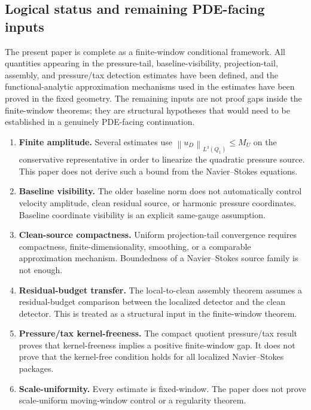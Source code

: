 \documentclass[11pt]{article}
\numberwithin{equation}{section}
\theoremstyle{definition}
\theoremstyle{remark}
\newcommand{\norm}[2]{\left\|#1\right\|_{#2}}
\begin{document}
\subsection{Logical status and remaining PDE-facing inputs}
\label{sec:status-limitations}

The present paper is complete as a finite-window conditional framework.  All
quantities appearing in the pressure-tail, baseline-visibility, projection-tail,
assembly, and pressure/tax detection estimates have been defined, and the
functional-analytic approximation mechanisms used in the estimates have been
proved in the fixed geometry.  The remaining inputs are not proof gaps inside
the finite-window theorems; they are structural hypotheses that would need to be
established in a genuinely PDE-facing continuation.

\begin{enumerate}[label=(\roman*),leftmargin=*]
    \item \textbf{Finite amplitude.}  Several estimates use
    \(\norm{u_D}{L^3(Q_1)}\le M_U\) on the conservative representative in order
    to linearize the quadratic pressure source.  This paper does not derive
    such a bound from the Navier--Stokes equations.
    \item \textbf{Baseline visibility.}  The older baseline norm does not
    automatically control velocity amplitude, clean residual source, or
    harmonic pressure coordinates.  Baseline coordinate visibility is an
    explicit same-gauge assumption.
    \item \textbf{Clean-source compactness.}  Uniform projection-tail
    convergence requires compactness, finite-dimensionality, smoothing, or a
    comparable approximation mechanism.  Boundedness of a Navier--Stokes source
    family is not enough.
    \item \textbf{Residual-budget transfer.}  The local-to-clean assembly
    theorem assumes a residual-budget comparison between the localized detector
    and the clean detector.  This is treated as a structural input in the finite-window theorem.
    \item \textbf{Pressure/tax kernel-freeness.}  The compact quotient
    pressure/tax result proves that kernel-freeness implies a positive
    finite-window gap.  It does not prove that the kernel-free condition holds
    for all localized Navier--Stokes packages.
    \item \textbf{Scale-uniformity.}  Every estimate is fixed-window.  The
    paper does not prove scale-uniform moving-window control or a
    regularity theorem.
\end{enumerate}
\end{document}
